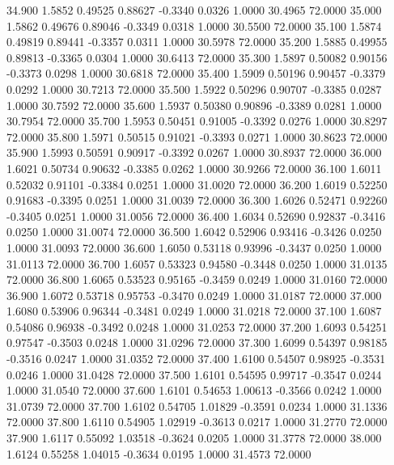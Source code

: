   34.900   1.5852   0.49525   0.88627  -0.3340   0.0326   1.0000  30.4965  72.0000
  35.000   1.5862   0.49676   0.89046  -0.3349   0.0318   1.0000  30.5500  72.0000
  35.100   1.5874   0.49819   0.89441  -0.3357   0.0311   1.0000  30.5978  72.0000
  35.200   1.5885   0.49955   0.89813  -0.3365   0.0304   1.0000  30.6413  72.0000
  35.300   1.5897   0.50082   0.90156  -0.3373   0.0298   1.0000  30.6818  72.0000
  35.400   1.5909   0.50196   0.90457  -0.3379   0.0292   1.0000  30.7213  72.0000
  35.500   1.5922   0.50296   0.90707  -0.3385   0.0287   1.0000  30.7592  72.0000
  35.600   1.5937   0.50380   0.90896  -0.3389   0.0281   1.0000  30.7954  72.0000
  35.700   1.5953   0.50451   0.91005  -0.3392   0.0276   1.0000  30.8297  72.0000
  35.800   1.5971   0.50515   0.91021  -0.3393   0.0271   1.0000  30.8623  72.0000
  35.900   1.5993   0.50591   0.90917  -0.3392   0.0267   1.0000  30.8937  72.0000
  36.000   1.6021   0.50734   0.90632  -0.3385   0.0262   1.0000  30.9266  72.0000
  36.100   1.6011   0.52032   0.91101  -0.3384   0.0251   1.0000  31.0020  72.0000
  36.200   1.6019   0.52250   0.91683  -0.3395   0.0251   1.0000  31.0039  72.0000
  36.300   1.6026   0.52471   0.92260  -0.3405   0.0251   1.0000  31.0056  72.0000
  36.400   1.6034   0.52690   0.92837  -0.3416   0.0250   1.0000  31.0074  72.0000
  36.500   1.6042   0.52906   0.93416  -0.3426   0.0250   1.0000  31.0093  72.0000
  36.600   1.6050   0.53118   0.93996  -0.3437   0.0250   1.0000  31.0113  72.0000
  36.700   1.6057   0.53323   0.94580  -0.3448   0.0250   1.0000  31.0135  72.0000
  36.800   1.6065   0.53523   0.95165  -0.3459   0.0249   1.0000  31.0160  72.0000
  36.900   1.6072   0.53718   0.95753  -0.3470   0.0249   1.0000  31.0187  72.0000
  37.000   1.6080   0.53906   0.96344  -0.3481   0.0249   1.0000  31.0218  72.0000
  37.100   1.6087   0.54086   0.96938  -0.3492   0.0248   1.0000  31.0253  72.0000
  37.200   1.6093   0.54251   0.97547  -0.3503   0.0248   1.0000  31.0296  72.0000
  37.300   1.6099   0.54397   0.98185  -0.3516   0.0247   1.0000  31.0352  72.0000
  37.400   1.6100   0.54507   0.98925  -0.3531   0.0246   1.0000  31.0428  72.0000
  37.500   1.6101   0.54595   0.99717  -0.3547   0.0244   1.0000  31.0540  72.0000
  37.600   1.6101   0.54653   1.00613  -0.3566   0.0242   1.0000  31.0739  72.0000
  37.700   1.6102   0.54705   1.01829  -0.3591   0.0234   1.0000  31.1336  72.0000
  37.800   1.6110   0.54905   1.02919  -0.3613   0.0217   1.0000  31.2770  72.0000
  37.900   1.6117   0.55092   1.03518  -0.3624   0.0205   1.0000  31.3778  72.0000
  38.000   1.6124   0.55258   1.04015  -0.3634   0.0195   1.0000  31.4573  72.0000
